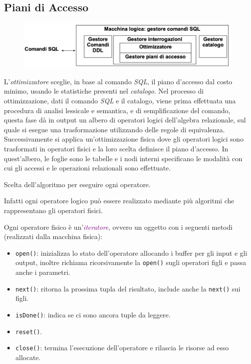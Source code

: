 \subsection{Piani di Accesso}

\begin{figure}[H]
    \centering
    \includegraphics[scale=0.35]{img/piani_accesso.png}
\end{figure}

L'\emph{ottimizzatore} sceglie, in base al comando \emph{SQL}, il piano d'accesso
dal costo minimo, usando le statistiche presenti nel \emph{catalogo}. Nel processo di ottimizzazione,
dati il comando \emph{SQL} e il catalogo, viene prima effettuata una procedura di analisi lessicale e semantica, e di
semplificazione del comando, questa fase dà in output un albero di operatori logici dell'algebra relazionale,
sul quale si esegue una trasformazione utilizzando delle regole di equivalenza. Successivamente si applica
un'ottimizzazione fisica dove gli operatori logici sono trasformati in operatori
fisici e la loro scelta definisce il piano d'accesso. In quest'albero, le foglie sono le tabelle
e i nodi interni specificano le modalità con cui gli accessi e le operazioni relazionali sono effettuate.

\begin{definition}
    Scelta dell'algoritmo per eseguire ogni operatore.
\end{definition}

Infatti ogni operatore logico può essere realizzato mediante più algoritmi
che rappresentano gli operatori fisici.

Ogni operatore fisico è un'\textcolor{purple}{\emph{iteratore}}, ovvero un oggetto con i seguenti metodi (realizzati dalla macchina fisica):
\begin{itemize}
    \item \verb|open()|: inizializza lo stato dell'operatore allocando i buffer per gli input e gli output,
        inoltre richiama ricorsivamente la \verb|open()| sugli operatori figli e passa anche i parametri.
    \item \verb|next()|: ritorna la prossima tupla del risultato, include anche la \verb|next()| sui figli.
    \item \verb|isDone()|: indica se ci sono ancora tuple da leggere.
    \item \verb|reset()|.
    \item \verb|close()|: termina l'esecuzione dell'operatore e rilascia le risorse ad esso allocate.
\end{itemize}

